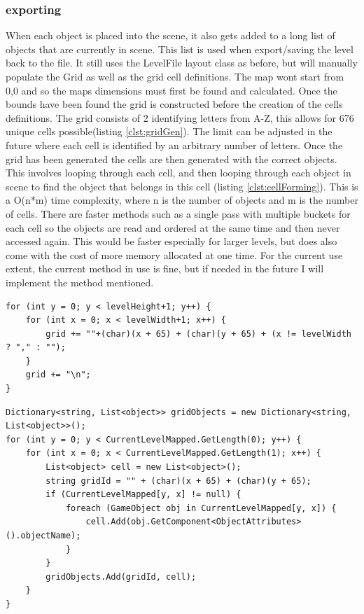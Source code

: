 \subsubsection{exporting}
When each object is placed into the scene, it also gets added to a long list of objects that are currently in scene. This list is used when export/saving the level back to the file. It still uses the LevelFile layout class as before, but will manually populate the Grid as well as the grid cell definitions. The map wont start from 0,0 and so the maps dimensions must first be found and calculated. Once the bounds have been found the grid is constructed before the creation of the cells definitions. The grid consists of 2 identifying letters from A-Z, this allows for 676 unique cells possible(listing \ref{clst:gridGen}). The limit can be adjusted in the future where each cell is identified by an arbitrary number of letters. Once the grid has been generated the cells are then generated with the correct objects. This involves looping through each cell, and then looping through each object in scene to find the object that belongs in this cell (listing \ref{clst:cellForming}). This is a O(n*m) time complexity, where n is the number of objects and m is the number of cells. There are faster methods such as a single pass with multiple buckets for each cell so the objects are read and ordered at the same time and then never accessed again. This would be faster especially for larger levels, but does also come with the cost of more memory allocated at one time. For the current use extent, the current method in use is fine, but if needed in the future I will implement the method mentioned.

\begin{minipage}{\textwidth}
\begin{lstlisting}[language={[Sharp]C}, caption=grid generation, label=clst:gridGen]
for (int y = 0; y < levelHeight+1; y++) {
	for (int x = 0; x < levelWidth+1; x++) {
		grid += ""+(char)(x + 65) + (char)(y + 65) + (x != levelWidth ? "," : "");
	}
	grid += "\n";
}
\end{lstlisting}
\end{minipage}


\begin{minipage}{\textwidth}
\begin{lstlisting}[language={[Sharp]C}, caption=code used for cell forming, label=clst:cellForming]
Dictionary<string, List<object>> gridObjects = new Dictionary<string, List<object>>();
for (int y = 0; y < CurrentLevelMapped.GetLength(0); y++) {
	for (int x = 0; x < CurrentLevelMapped.GetLength(1); x++) {
		List<object> cell = new List<object>();
		string gridId = "" + (char)(x + 65) + (char)(y + 65);
		if (CurrentLevelMapped[y, x] != null) {
			foreach (GameObject obj in CurrentLevelMapped[y, x]) {
				cell.Add(obj.GetComponent<ObjectAttributes>().objectName);
			}
		}
		gridObjects.Add(gridId, cell);
	}
}
\end{lstlisting}
\end{minipage}




